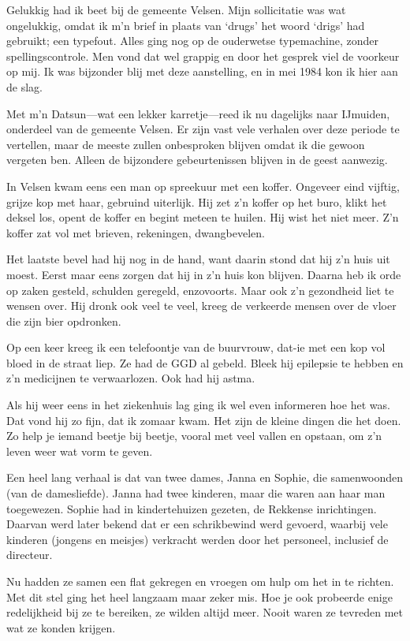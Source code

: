 \documentclass[10pt,twoside, openright]{memoir}
\begin{document}
Gelukkig had ik beet bij de gemeente Velsen. Mijn sollicitatie was wat ongelukkig, omdat ik m’n brief in plaats van `drugs' het woord `drigs' had gebruikt; een typefout. Alles ging nog op de ouderwetse typemachine, zonder spellingscontrole. Men vond dat wel grappig en door het gesprek viel de voorkeur op mij. Ik was bijzonder blij met deze aanstelling, en in mei 1984 kon ik hier aan de slag.

Met m’n Datsun---wat een lekker karretje---reed ik nu dagelijks naar IJmuiden, onderdeel van de gemeente Velsen. Er zijn vast vele verhalen over deze periode te vertellen, maar de meeste zullen onbesproken blijven omdat ik die gewoon vergeten ben. Alleen de bijzondere gebeurtenissen blijven in de geest aanwezig.

In Velsen kwam eens een man op spreekuur met een koffer. Ongeveer eind vijftig, grijze kop met haar, gebruind uiterlijk. Hij zet z’n koffer op het buro, klikt het deksel los, opent de koffer en begint meteen te huilen. Hij wist het niet meer. Z’n koffer zat vol met brieven, rekeningen, dwangbevelen. 

Het laatste bevel had hij nog in de hand, want daarin stond dat hij z’n huis uit moest. Eerst maar eens zorgen dat hij in z’n huis kon blijven. Daarna heb ik orde op zaken gesteld, schulden geregeld, enzovoorts. Maar ook z’n gezondheid liet te wensen over. Hij dronk ook veel te veel, kreeg de verkeerde mensen over de vloer die zijn bier opdronken. 

Op een keer kreeg ik een telefoontje van de buurvrouw, dat-ie met een kop vol bloed in de straat liep. Ze had de GGD al gebeld. Bleek hij epilepsie te hebben en z’n medicijnen te verwaarlozen. Ook had hij astma. 

Als hij weer eens in het ziekenhuis lag ging ik wel even informeren hoe het was. Dat vond hij zo fijn, dat ik zomaar kwam. Het zijn de kleine dingen die het doen. Zo help je iemand beetje bij beetje, vooral met veel vallen en opstaan, om z’n leven weer wat vorm te geven.

Een heel lang verhaal is dat van twee dames, Janna en Sophie, die samenwoonden (van de damesliefde). Janna had twee kinderen, maar die waren aan haar man toegewezen. Sophie had in kindertehuizen gezeten, de Rekkense inrichtingen. Daarvan werd later bekend dat er een schrikbewind werd gevoerd, waarbij vele kinderen (jongens en meisjes) verkracht werden door het personeel, inclusief de directeur. 

Nu hadden ze samen een flat gekregen en vroegen om hulp om het in te richten. Met dit stel ging het heel langzaam maar zeker mis. Hoe je ook probeerde enige redelijkheid bij ze te bereiken, ze wilden altijd meer. Nooit waren ze tevreden met wat ze konden krijgen. 
\end{document}
